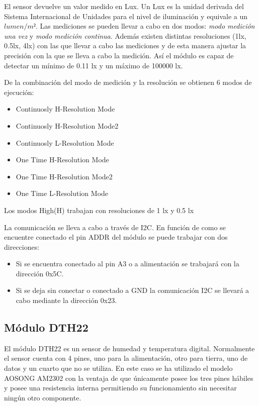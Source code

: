 El sensor devuelve un valor medido en Lux. Un Lux es la unidad
derivada del Sistema Internacional de Unidades para el nivel de
iluminaci\'on y equivale a un $lumen/m²$. Las mediciones se pueden
llevar a cabo en dos modos: \emph{modo medici\'on una vez} y \emph{modo
  medici\'on continua}. Adem\'as existen distintas resoluciones (1lx,
0.5lx, 4lx) con
las que llevar a cabo las mediciones y de esta manera ajustar la
precisi\'on con la que se lleva a cabo la medici\'on. As\'i el m\'odulo es capaz de detectar un
m\'inimo de 0.11 lx y un m\'aximo de 100000 lx. 

De la combinaci\'on del modo de medici\'on y la resoluci\'on se
obtienen 6 modos de ejecuci\'on:
\begin{itemize}
\item Continuosly H-Resolution Mode
\item Continuosly H-Resolution Mode2
\item Continuosly L-Resolution Mode
\item One Time H-Resolution Mode
\item One Time H-Resolution Mode2
\item One Time L-Resolution Mode
\end{itemize}

Los modos High(H) trabajan con resoluciones de 1 lx y 0.5 lx 

La comunicaci\'on se lleva a cabo a través de I2C. En funci\'on de
como se encuentre conectado el pin ADDR del m\'odulo se puede trabajar
con dos direcciones:
\begin{itemize}
\item Si se encuentra conectado al pin A3 o a alimentaci\'on se
  trabajar\'a con la direcci\'on 0x5C.
\item Si se deja sin conectar o conectado a GND la comunicaci\'on I2C
  se llevar\'a a cabo mediante la direcci\'on 0x23.
\end{itemize}

\subsection{M\'odulo DTH22}\label{subsec:dht22}

El m\'odulo DTH22 es un sensor de humedad y temperatura
digital. Normalmente el sensor cuenta con 4 pines, uno para la
alimentaci\'on, otro para tierra, uno de datos y un cuarto que no se
utiliza. En este caso se ha utilizado el modelo AOSONG AM2302 con la
ventaja de que \'unicamente posee los tres pines h\'abiles y posee una
resistencia interna permitiendo su funcionamiento sin necesitar
ning\'un otro componente.

